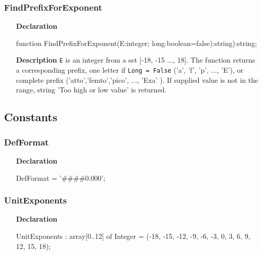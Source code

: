 \documentclass[12pt,a4paper,oneside]{report}
\newcommand{\declarationitem}[1]{\textbf{#1}}
\newcommand{\descriptiontitle}[1]{\textbf{#1}}
\newcommand{\code}[1]{\texttt{#1}}
\begin{document}
\subsubsection{FindPrefixForExponent}
\label{lmunitsformat-FindPrefixForExponent}
\begin{itemize}\item[\declarationitem{Declaration}\hfill]
	\begin{flushleft}
		\begin{ttfamily}
			function FindPrefixForExponent(E:integer; long:boolean=false):string):string;\end{ttfamily}
	\end{flushleft}
\item[\descriptiontitle{Description}]
\code{E} is an integer from a set [-18, -15 ..., 18]. The function returns a corresponding prefix, one letter if \code{Long = False} ('a', 'f', 'p', ..., 'E'), or complete prefix ('atto','femto','pico', ..., 'Exa' ). If supplied value is not in the range, string 'Too high or low value' is returned.	
\end{itemize}
\subsection{Constants}
\subsubsection{DefFormat}
\label{lmunitsformat-DefFormat}
\begin{itemize}\item[\declarationitem{Declaration}\hfill]
	\begin{flushleft}
		\begin{ttfamily}
			DefFormat = '{\#}{\#}{\#}{\#}0.000';\end{ttfamily}
		
	\end{flushleft}
	
\end{itemize}
\subsubsection{UnitExponents}
\label{lmunitsformat-UnitExponents}
\begin{itemize}\item[\declarationitem{Declaration}\hfill]
	\begin{flushleft}
		\begin{ttfamily}
			UnitExponents : array[0..12] of Integer = (-18, -15, -12, -9, -6, -3, 0, 3, 6, 9, 12, 15, 18);\end{ttfamily}
		
	\end{flushleft}
	
\end{itemize}
\end{document}
